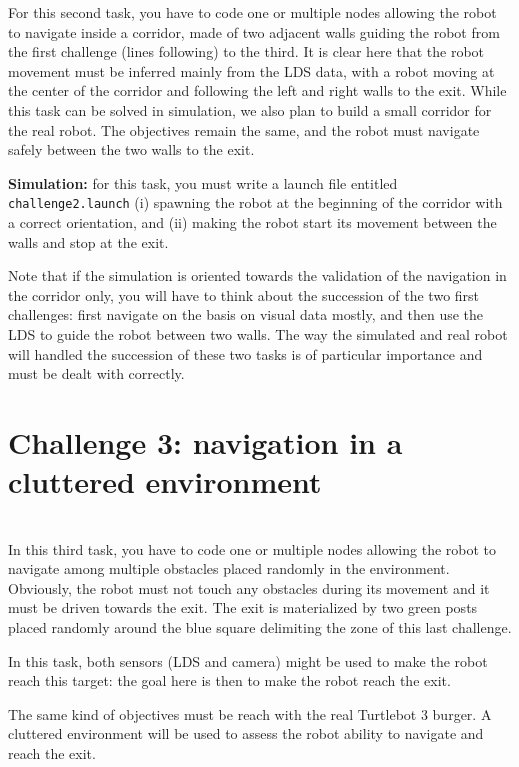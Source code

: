\documentclass[10pt,a4paper,printanswers]{upmc}
\newcommand{\myline}{\noindent\makebox[\linewidth]{\rule{\textwidth}{0.7pt}}}
\begin{document}
For this second task, you have to code one or multiple nodes allowing the robot to navigate inside a
corridor, made of two adjacent walls guiding the robot from the first challenge (lines following) to
the third. It is clear here that the robot movement must be inferred mainly from the LDS data, with
a robot moving at the center of the corridor and following the left and right walls to the exit.
%
While this task can be solved in simulation, we also plan to build a small corridor for the real
robot. The objectives remain the same, and the robot must navigate safely between the two walls to
the exit.

\begin{mdframed}[style=evaluation]
  \textbf{Simulation:} for this task, you must write a launch file entitled
  \texttt{challenge2.launch} (i) spawning the robot at the beginning of the corridor with a
  correct orientation, and (ii) making the robot start its movement between the walls and stop
  at the exit.
\end{mdframed}

Note that if the simulation is oriented towards the validation of the navigation in the corridor
only, you will have to think about the succession of the two first challenges: first navigate on the
basis on visual data mostly, and then use the LDS to guide the robot between two walls. The way the
simulated and real robot will handled the succession of these two tasks is of particular importance
and must be dealt with correctly.

\section{Challenge 3: navigation in a cluttered environment}
\vspace{-0.5cm}\myline\\

In this third task, you have to code one or multiple nodes allowing the robot to navigate among
multiple obstacles placed randomly in the environment. Obviously, the robot must not touch any
obstacles during its movement and it must be driven towards the exit. The exit is materialized by two green posts placed randomly around the blue square delimiting the zone of this last challenge. 

In this task,
both sensors (LDS and camera) might be used to make the robot reach this target: the goal here is
then to make the robot reach the exit.

The same kind of objectives must be reach with the real Turtlebot 3 burger. A cluttered environment
will be used to assess the robot ability to navigate and reach the exit.
\end{document}
